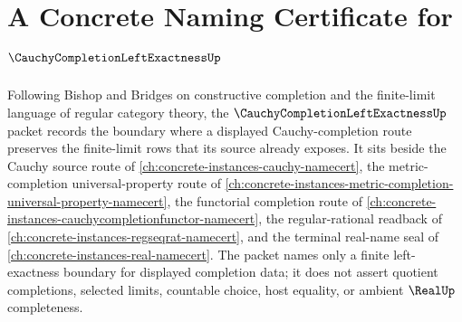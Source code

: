 \chapter{A Concrete Naming Certificate for $\CauchyCompletionLeftExactnessUp$}
\label{ch:concrete-instances-cauchy-completion-left-exactness-namecert}

Following Bishop and Bridges on constructive completion and the finite-limit language of regular category theory, the $\CauchyCompletionLeftExactnessUp$ packet records the boundary where a displayed Cauchy-completion route preserves the finite-limit rows that its source already exposes. It sits beside the Cauchy source route of \autoref{ch:concrete-instances-cauchy-namecert}, the metric-completion universal-property route of \autoref{ch:concrete-instances-metric-completion-universal-property-namecert}, the functorial completion route of \autoref{ch:concrete-instances-cauchycompletionfunctor-namecert}, the regular-rational readback of \autoref{ch:concrete-instances-regseqrat-namecert}, and the terminal real-name seal of \autoref{ch:concrete-instances-real-namecert}. The packet names only a finite left-exactness boundary for displayed completion data; it does not assert quotient completions, selected limits, countable choice, host equality, or ambient $\RealUp$ completeness.

